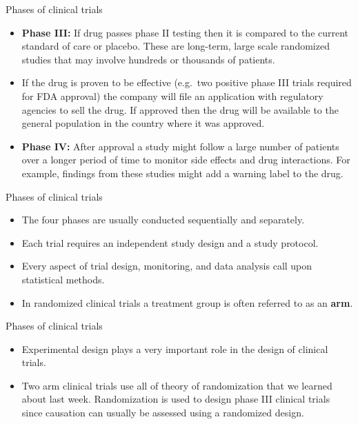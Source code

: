 \documentclass[ignorenonframetext,]{beamer}
\providecommand{\tightlist}{%
\setlength{\itemsep}{0pt}\setlength{\parskip}{0pt}}
\begin{document}
\begin{frame}{Phases of clinical trials}

\begin{itemize}
\item
  \textbf{Phase III:} If drug passes phase II testing then it is
  compared to the current standard of care or placebo. These are
  long-term, large scale randomized studies that may involve hundreds or
  thousands of patients.
\item
  If the drug is proven to be effective (e.g.~two positive phase III
  trials required for FDA approval) the company will file an application
  with regulatory agencies to sell the drug. If approved then the drug
  will be available to the general population in the country where it
  was approved.
\item
  \textbf{Phase IV:} After approval a study might follow a large number
  of patients over a longer period of time to monitor side effects and
  drug interactions. For example, findings from these studies might add
  a warning label to the drug.
\end{itemize}

\end{frame}

\begin{frame}{Phases of clinical trials}

\begin{itemize}
\tightlist
\item
  The four phases are usually conducted sequentially and separately.
\item
  Each trial requires an independent study design and a study protocol.
\item
  Every aspect of trial design, monitoring, and data analysis call upon
  statistical methods.
\item
  In randomized clinical trials a treatment group is often referred to
  as an \textbf{arm}.
\end{itemize}

\end{frame}

\begin{frame}{Phases of clinical trials}

\begin{itemize}
\item
  Experimental design plays a very important role in the design of
  clinical trials.
\item
  Two arm clinical trials use all of theory of randomization that we
  learned about last week. Randomization is used to design phase III
  clinical trials since causation can usually be assessed using a
  randomized design.
\end{itemize}

\end{frame}
\end{document}
